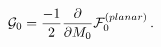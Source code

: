 \begin{equation}
{\cal G}_{0}=\frac{-1}{2}\frac{\partial }{\partial M_{0}}
{\cal F}_{0}^{(planar)}\,.
\label{rule}
\end{equation}

